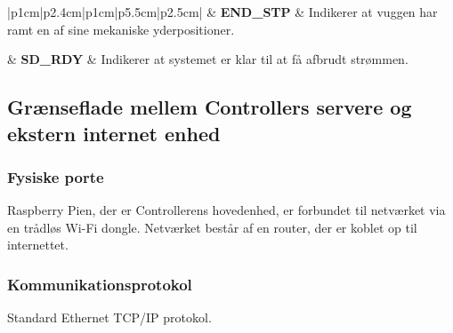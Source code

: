 \begin{center}
\begin{table}[H]
\begin{tabular}{|p{1cm}|p{2.4cm}|p{1cm}|p{5.5cm}|p{2.5cm}|}
	& {\textbf{END\_STP}} &  {Indikerer at vuggen har ramt en af sine mekaniske yderpositioner.} \\ 

	& {\textbf{SD\_RDY}} &  {Indikerer at systemet er klar til at få afbrudt strømmen.} \\
\hline 
\end{tabular}
\end{table}
\end{center} 

\subsection{Grænseflade mellem Controllers servere og ekstern internet enhed}
\subsubsection*{Fysiske porte}

Raspberry Pien, der er Controllerens hovedenhed, er forbundet til netværket via en trådløs Wi-Fi dongle. Netværket består af en router, der er koblet op til internettet.

\subsubsection*{Kommunikationsprotokol}

Standard Ethernet TCP/IP protokol.